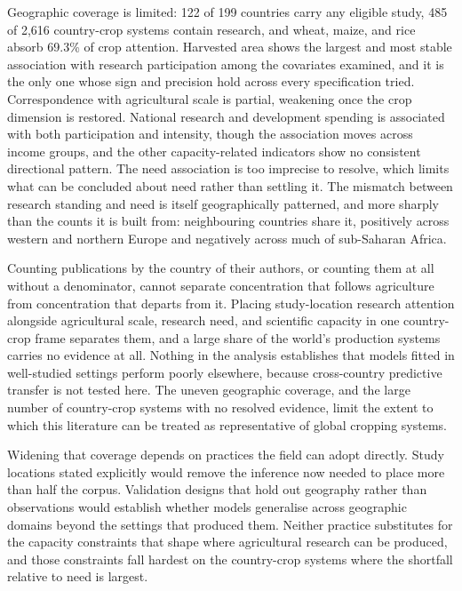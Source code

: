 \documentclass[ASNA,twocolumn]{USG}
\begin{document}
Geographic coverage is limited: 122 of 199 countries carry any eligible study, 485 of 2,616
country-crop systems contain research, and wheat, maize, and rice absorb 69.3\% of crop
attention. Harvested area shows the largest and most stable association with research
participation among the covariates examined, and it is the only one whose sign and precision hold
across every specification tried.
Correspondence with agricultural scale is partial, weakening once the crop dimension is
restored. National research and development spending is associated with both participation and
intensity, though the association moves across income groups, and the other capacity-related
indicators show no consistent directional pattern. The need association is too imprecise to
resolve, which limits what can be concluded about need rather than settling it. The mismatch between research standing and need is itself
geographically patterned, and more sharply than the counts it is built from: neighbouring
countries share it, positively across western and northern Europe and negatively across much
of sub-Saharan Africa.

Counting publications by the country of their authors, or counting them at all without a
denominator, cannot separate concentration that follows agriculture from concentration that
departs from it. Placing study-location research attention alongside agricultural scale, research need, and
scientific capacity in one country-crop frame separates them, and a large share of the world's
production systems carries no evidence at all. Nothing in the analysis establishes that models
fitted in well-studied settings perform poorly elsewhere, because cross-country predictive
transfer is not tested here. The uneven geographic coverage, and the large number of country-crop
systems with no resolved evidence, limit the extent to which this literature can be treated as
representative of global cropping systems.

Widening that coverage depends on practices the field can adopt directly. Study locations
stated explicitly would remove the inference now needed to place more than half the corpus.
Validation designs that hold out geography rather than observations would establish whether
models generalise across geographic domains beyond the settings that produced them. Neither practice substitutes for the
capacity constraints that shape where agricultural research can be produced, and those
constraints fall hardest on the country-crop systems where the shortfall relative to need is
largest.
\end{document}
